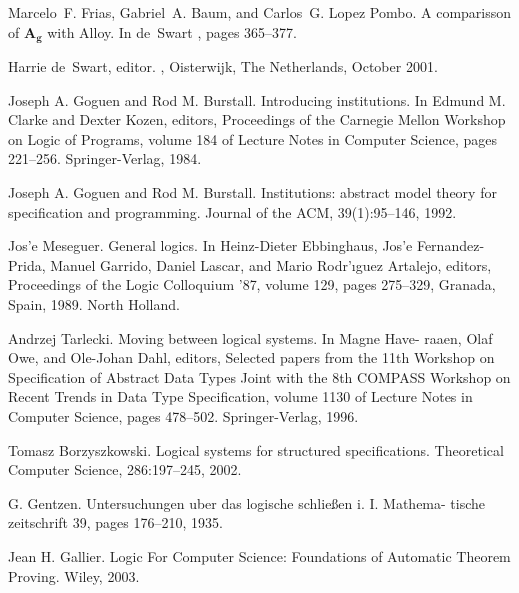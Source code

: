 \begin{thebibliography}{tesis}
Marcelo~{F.} Frias, Gabriel~{A.} Baum, and Carlos~{G.} {Lopez Pombo}.
\newblock A comparisson of $\mathbf{A_g}$ with {Alloy}.
\newblock In de~Swart \cite{relmics01}, pages 365--377.

Harrie de~Swart, editor.
, Oisterwijk, The Netherlands, October 2001.
  
	Joseph A. Goguen and Rod M. Burstall. Introducing institutions. In Edmund M. Clarke and Dexter Kozen, editors, Proceedings of the Carnegie Mellon Workshop on Logic of Programs, volume 184 of Lecture Notes in Computer Science, pages 221–256. Springer-Verlag, 1984.

  Joseph A. Goguen and Rod M. Burstall. Institutions: abstract model theory for specification and programming. Journal of the ACM, 39(1):95–146, 1992.

	Jos'e Meseguer. General logics. In Heinz-Dieter Ebbinghaus, Jos'e Fernandez-Prida, Manuel Garrido, Daniel Lascar, and Mario Rodr'ıguez Artalejo, editors, Proceedings of the Logic Colloquium ’87, volume 129, pages 275–329, Granada, Spain, 1989. North Holland.

	Andrzej Tarlecki. Moving between logical systems. In Magne Have- raaen, Olaf Owe, and Ole-Johan Dahl, editors, Selected papers from the 11th Workshop on Specification of Abstract Data Types Joint with the 8th COMPASS Workshop on Recent Trends in Data Type Specification, volume 1130 of Lecture Notes in Computer Science, pages 478–502. Springer-Verlag, 1996.

	Tomasz Borzyszkowski. Logical systems for structured specifications. Theoretical Computer Science, 286:197–245, 2002.

	G. Gentzen. Untersuchungen uber das logische schließen i. I. Mathema- tische zeitschrift 39, pages 176–210, 1935.
	
	Jean H. Gallier. Logic For Computer Science: Foundations of Automatic Theorem Proving. Wiley, 2003.

\end{thebibliography}

